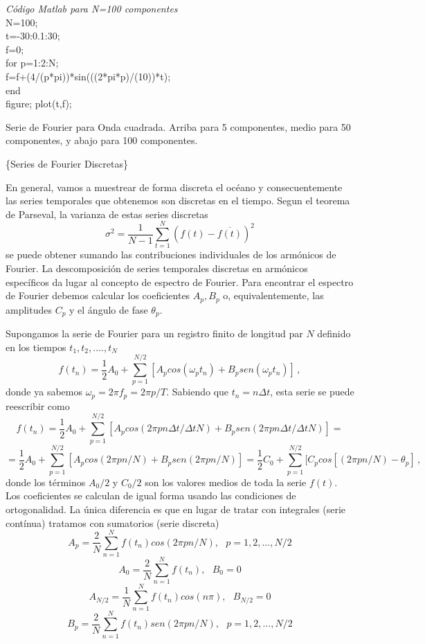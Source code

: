 \documentclass[
]{agujournal2019}
\begin{document}
\vspace{0.75cm}
\begin{framed}
{\it \textbf \noindent Código Matlab para N=100 componentes}
\\
{\noindent} N=100;\\
t=-30:0.1:30;\\
f=0;\\
for p=1:2:N;\\
f=f+(4/(p*pi))*sin(((2*pi*p)/(10))*t);\\
end\\
figure; plot(t,f);\\
\end{framed}

\begin{center}
\end{center}
\begin{center}
Serie de Fourier para Onda cuadrada. Arriba para 5 componentes, medio para 50 componentes, y abajo
para 100 componentes.
\end{center}

\vspace{0.25cm}

\{\textbf \large \noindent Series de Fourier Discretas\}

En general, vamos a muestrear de forma discreta el océano y
consecuentemente las series temporales que obtenemos son discretas en el
tiempo. Segun el teorema de Parseval, la varianza de estas series
discretas
\[\sigma^2=\frac{1}{N-1}\sum\limits^N_{t=1}(f(t)-\overline{f(t)})^2\] se
puede obtener sumando las contribuciones individuales de los armónicos
de Fourier. La descomposición de series temporales discretas en
armónicos específicos da lugar al concepto de espectro de Fourier. Para
encontrar el espectro de Fourier debemos calcular los coeficientes
\(A_p,B_p\) o, equivalentemente, las amplitudes \(C_p\) y el ángulo de
fase \(\theta_p\).

Supongamos la serie de Fourier para un registro finito de longitud par
\(N\) definido en los tiempos \(t_1, t_2,....,t_N\)
\[f(t_n)=\frac{1}{2}A_0+\sum\limits^{N/2}_{p=1}[A_p cos(\omega_p t_n) + B_p sen(\omega_p t_n)]\,,\]
donde ya sabemos \(\omega_p=2\pi f_p=2\pi p/T\). Sabiendo que
\(t_n=n \Delta t\), esta serie se puede reescribir como
\[f(t_n)=\frac{1}{2}A_0+\sum\limits^{N/2}_{p=1}[A_p cos(2\pi p n \Delta t / \Delta t N) + B_p sen(2\pi p n \Delta t / \Delta t N)]=\]
\[=\frac{1}{2}A_0+\sum\limits^{N/2}_{p=1}[A_p cos(2\pi p n  / N) + B_p sen(2\pi p n / N)]=
\frac{1}{2}C_0 + \sum\limits^{N/2}_{p=1}[C_p cos[(2\pi p n  / N) - \theta_p]\,,\]
donde los términos \(A_0/2\) y \(C_0/2\) son los valores medios de toda
la serie \(f(t)\). Los coeficientes se calculan de igual forma usando
las condiciones de ortogonalidad. La única diferencia es que en lugar de
tratar con integrales (serie contínua) tratamos con sumatorios (serie
discreta)
\[A_p=\frac{2}{N}\sum\limits_{n=1}^{N} f(t_n) cos(2\pi p n /N),\,\,\,\,p=1,2,...,N/2\]
\[A_0=\frac{2}{N}\sum\limits_{n=1}^{N} f(t_n),\,\,\,\,B_0=0\]
\[A_{N/2}=\frac{1}{N}\sum\limits_{n=1}^{N} f(t_n)cos(n\pi),\,\,\,\,B_{N/2}=0\]
\[B_p=\frac{2}{N}\sum\limits_{n=1}^{N} f(t_n) sen(2\pi p n /N),\,\,\,\,p=1,2,...,N/2\]
\end{document}
